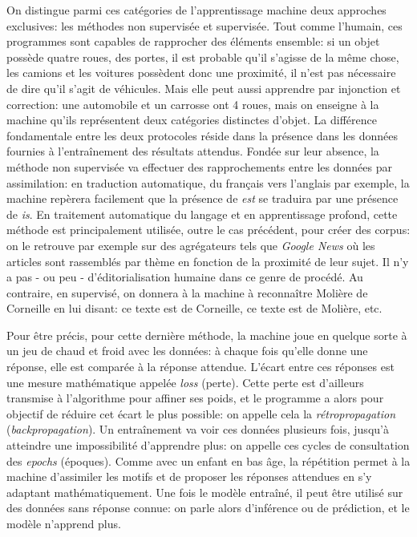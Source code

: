 On distingue parmi ces catégories de l'apprentissage machine deux approches exclusives: les méthodes non supervisée et supervisée. Tout comme l'humain, ces programmes sont capables de rapprocher des éléments ensemble: si un objet possède quatre roues, des portes, il est probable qu'il s'agisse de la même chose, les camions et les voitures possèdent donc une proximité, il n'est pas nécessaire de dire qu'il s'agit de véhicules. Mais elle peut aussi apprendre par injonction et correction: une automobile et un carrosse ont 4 roues, mais on enseigne à la machine qu'ils représentent deux catégories distinctes d'objet. La différence fondamentale entre les deux protocoles réside dans la présence dans les données fournies à l'entraînement des résultats attendus. Fondée sur leur absence, la méthode non supervisée va effectuer des rapprochements entre les données par assimilation: en traduction automatique, du français vers l'anglais par exemple, la machine repèrera facilement que la présence de \textit{est} se traduira par une présence de \textit{is}. En traitement automatique du langage et en apprentissage profond, cette méthode est principalement utilisée, outre le cas précédent, pour créer des corpus: on le retrouve par exemple sur des agrégateurs tels que \textit{Google News} où les articles sont rassemblés par thème en fonction de la proximité de leur sujet. Il n'y a pas - ou peu - d'éditorialisation humaine dans ce genre de procédé. Au contraire, en supervisé, on donnera à la machine à reconnaître Molière de Corneille en lui disant: ce texte est de Corneille, ce texte est de Molière, etc. 

Pour être précis, pour cette dernière méthode, la machine joue en quelque sorte à un jeu de chaud et froid avec les données: à chaque fois qu'elle donne une réponse, elle est comparée à la réponse attendue. L'écart entre ces réponses est une mesure mathématique appelée \textit{loss} (perte). Cette perte est d'ailleurs transmise à l'algorithme pour affiner ses poids, et le programme a alors pour objectif de réduire cet écart le plus possible: on appelle cela la \textit{rétropropagation} (\textit{backpropagation}). Un entraînement va voir ces données plusieurs fois, jusqu'à atteindre une impossibilité d'apprendre plus: on appelle ces cycles de consultation des \textit{epochs} (époques). Comme avec un enfant en bas âge, la répétition permet à la machine d'assimiler les motifs et de proposer les réponses attendues en s'y adaptant mathématiquement. Une fois le modèle entraîné, il peut être utilisé sur des données sans réponse connue: on parle alors d'inférence ou de prédiction, et le modèle n'apprend plus.

